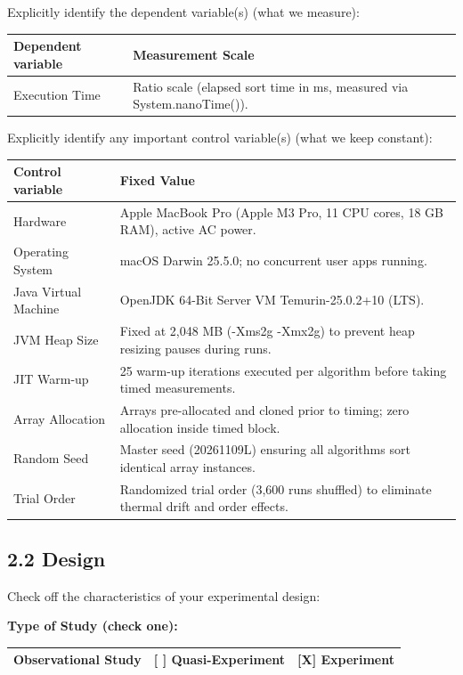 \documentclass[10pt,a4paper]{article}
\begin{document}
\vspace{0.25em}
Explicitly identify the dependent variable(s) (what we measure):

\noindent
\begin{tabularx}{\textwidth}{|l|X|}
\hline
\rowcolor{black} \color{white}\textbf{Dependent variable} & \color{white}\textbf{Measurement Scale} \\
\hline
Execution Time & Ratio scale (elapsed sort time in ms, measured via System.nanoTime()). \\
\hline
\end{tabularx}

\newpage
Explicitly identify any important control variable(s) (what we keep constant):

\noindent
\begin{tabularx}{\textwidth}{|l|X|}
\hline
\rowcolor{black} \color{white}\textbf{Control variable} & \color{white}\textbf{Fixed Value} \\
\hline
Hardware & Apple MacBook Pro (Apple M3 Pro, 11 CPU cores, 18 GB RAM), active AC power. \\
Operating System & macOS Darwin 25.5.0; no concurrent user apps running. \\
Java Virtual Machine & OpenJDK 64-Bit Server VM Temurin-25.0.2+10 (LTS). \\
JVM Heap Size & Fixed at 2,048 MB (-Xms2g -Xmx2g) to prevent heap resizing pauses during runs. \\
JIT Warm-up & 25 warm-up iterations executed per algorithm before taking timed measurements. \\
Array Allocation & Arrays pre-allocated and cloned prior to timing; zero allocation inside timed block. \\
Random Seed & Master seed (20261109L) ensuring all algorithms sort identical array instances. \\
Trial Order & Randomized trial order (3,600 runs shuffled) to eliminate thermal drift and order effects. \\
\hline
\end{tabularx}

\subsection*{2.2 Design}
Check off the characteristics of your experimental design:

\textbf{Type of Study (check one):}\\
\noindent
\begin{tabularx}{\textwidth}{|X|X|X|}
\hline
[ ] Observational Study & [ ] Quasi-Experiment & [\textbf{X}] \textbf{Experiment} \\
\hline
\end{tabularx}
\end{document}
